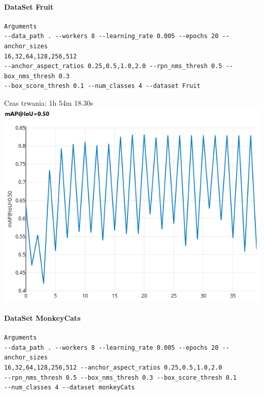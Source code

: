 \documentclass[11pt]{article}
\begin{document}
\hypertarget{dataset-fruit}{%
\paragraph{DataSet Fruit}\label{dataset-fruit}}

\begin{verbatim}
Arguments
--data_path . --workers 8 --learning_rate 0.005 --epochs 20 --anchor_sizes
16,32,64,128,256,512 
--anchor_aspect_ratios 0.25,0.5,1.0,2.0 --rpn_nms_thresh 0.5 --box_nms_thresh 0.3
--box_score_thresh 0.1 --num_classes 4 --dataset Fruit
\end{verbatim}

Czas trwania: 1h 54m 18.30s\newline
\includegraphics{image_report/metrik_friuts.png}

\hypertarget{dataset-monkeycats}{%
\paragraph{DataSet MonkeyCats}\label{dataset-monkeycats}}

\begin{verbatim}
Arguments
--data_path . --workers 8 --learning_rate 0.005 --epochs 20 --anchor_sizes
16,32,64,128,256,512 --anchor_aspect_ratios 0.25,0.5,1.0,2.0 
--rpn_nms_thresh 0.5 --box_nms_thresh 0.3 --box_score_thresh 0.1 
--num_classes 4 --dataset monkeyCats
\end{verbatim}
\end{document}
